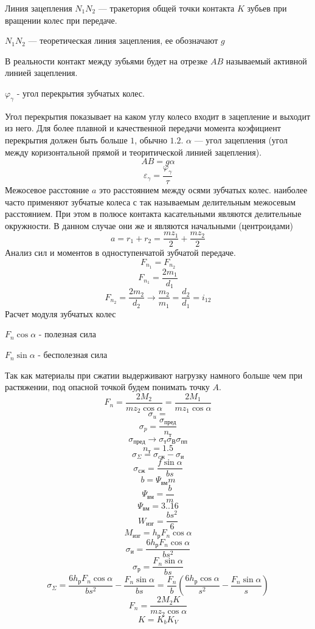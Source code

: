 \documentclass{article}
\begin{document}
Линия зацепления $N_1N_2$ --- тракетория общей точки контакта $K$ зубьев при вращении колес при передаче.

$N_1N_2$ --- теоретическая линия зацепления, ее обозначают $g$

В реальности контакт между зубьями будет на отрезке $AB$ называемый активной линией зацепления.

$\varphi_{\gamma}$ - угол перекрытия зубчатых колес.

Угол перекрытия показывает на каком углу колесо входит в зацепление и выходит из него.
Для более плавной и качественной передачи момента коэфициент перекрытия должен быть больше $1$, обычно $1.2$.
$\alpha$ --- угол зацепления (угол между коризонтальной прямой и теоритической линией зацепления).
$$
AB = g \alpha
$$
$$
\varepsilon_{\gamma}=\frac{\varphi_{\gamma}}{\tau}
$$
Межосевое расстояние $a$ это расстоянием между осями зубчатых колес. наиболее часто применяют зубчатые колеса с так называемым делительным межосевым расстоянием. При этом в полюсе контакта касательными являются делительные окружности.
В данном случае они же и являются начальными (центроидами)
$$
a = r_1 + r_2 = \frac{mz_1}{2} + \frac{mz_2}{2}
$$
Анализ сил и моментов в одноступенчатой зубчатой передаче.
$$
F_{n_1} = F_{n_2}
$$
$$
F_{n_1} = \frac{2m_1}{d_1}
$$
$$
F_{n_2} = \frac{2m_2}{d_2} \to \frac{m_2}{m_1} = \frac{d_2}{d_1}=i_{12}
$$
Расчет модуля зубчатых колес

$F_{n} \cos{\alpha}$ - полезная сила

$F_{n} \sin{\alpha}$ - бесполезная сила  

Так как материалы при сжатии выдерживают нагрузку намного больше чем при растяжении, под опасной точкой будем понимать точку $A$.
$$
F_n = \frac{2M_2}{mz_2\cos{\alpha}} = \frac{2M_1}{mz_1\cos{\alpha}}
$$
$$
\sigma_u = 
$$
$$
\sigma_p = \frac{\sigma_{пред}}{n_{т}}
$$
$$
\sigma_{пред} \to \sigma_{т} \sigma_{В} \sigma_{пп}
$$
$$
n_т = 1.5
$$
$$
\sigma_\Sigma = \sigma_{cж} - \sigma_{и}
$$
$$
\sigma_{сж} = \frac{f\sin{\alpha}}{bs}
$$
$$
b = \Psi_{вм}m
$$
$$
\Psi_{вм} = \frac{b}{m}
$$
$$
\Psi_{вм} = 3..16
$$
$$
W_{изг} = \frac{bs^2}{6}
$$
$$
M_{изг} = h_рF_n\cos{\alpha}
$$
$$
\sigma_и = \frac{6h_рF_n\cos{\alpha}}{bs^2}
$$
$$
\sigma_р = \frac{F_n\sin{\alpha}}{bs}
$$
$$
\sigma_{\Sigma} = \frac{6h_рF_n\cos{\alpha}}{bs^2} - \frac{F_n\sin{\alpha}}{bs} = \frac{F_n}{b}(\frac{6h_р\cos{\alpha}}{s^2} - \frac{F_n\sin{\alpha}}{s})
$$
$$
F_n = \frac{2M_2K}{mz_2\cos{\alpha}}
$$
$$
K = K_bK_V
$$
\end{document}
